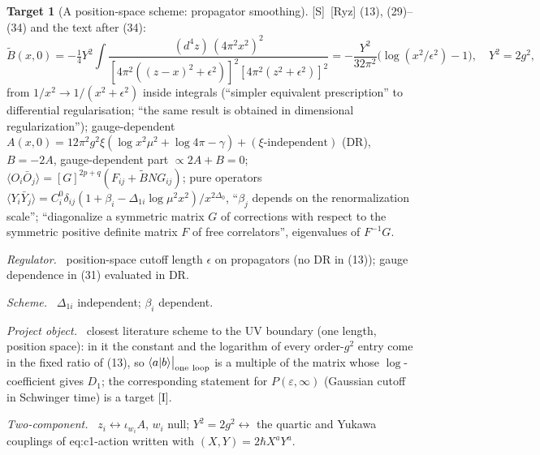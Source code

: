 \documentclass[11pt]{article}
\theoremstyle{definition}
\newtheorem{target}{Target}
\newcommand{\Sl}{\textup{[S]}}
\newcommand{\Il}{\textup{[I]}}
\newcommand{\oneloop}{\big|_{\rm one\ loop}}
\newcommand{\fld}[1]{\par\textit{#1.}\ }
\begin{document}
\begin{target}[A position-space scheme: propagator smoothing]\label{t:ryz}
\Sl\ [Ryz] (13), (29)--(34) and the text after (34):
\[
\tilde B(x,0)=-\tfrac14Y^2\!\int\!\frac{(d^4z)\,(4\pi^2x^2)^2}{[4\pi^2((z-x)^2+\epsilon^2)]^2[4\pi^2(z^2+\epsilon^2)]^2}=-\frac{Y^2}{32\pi^2}\big(\log(x^2/\epsilon^2)-1\big),\quad Y^2=2g^2,
\]
from $1/x^2\to1/(x^2+\epsilon^2)$ inside integrals (``simpler equivalent prescription'' to differential regularisation; ``the same result is obtained in dimensional regularization''); gauge-dependent $A(x,0)=12\pi^2g^2\xi(\log x^2\mu^2+\log4\pi-\gamma)+(\xi\text{-independent})$ (DR), $B=-2A$, gauge-dependent part $\propto2A+B=0$; $\langle O_i\bar O_j\rangle=[G]^{2p+q}(F_{ij}+\tilde BNG_{ij})$; pure operators $\langle Y_i\bar Y_j\rangle=C_i^0\delta_{ij}(1+\beta_i-\Delta_{1i}\log\mu^2x^2)/x^{2\Delta_0}$, ``$\beta_j$ depends on the renormalization scale''; ``diagonalize a symmetric matrix $G$ of corrections with respect to the symmetric positive definite matrix $F$ of free correlators'', eigenvalues of $F^{-1}G$.
\fld{Regulator} position-space cutoff length $\epsilon$ on propagators (no DR in (13)); gauge dependence in (31) evaluated in DR.
\fld{Scheme} $\Delta_{1i}$ independent; $\beta_i$ dependent.
\fld{Project object} closest literature scheme to the UV boundary (one length, position space): in it the constant and the logarithm of every order-$g^2$ entry come in the fixed ratio of (13), so $\langle a|b\rangle\oneloop$ is a multiple of the matrix whose $\log$-coefficient gives $D_1$; the corresponding statement for $P(\varepsilon,\infty)$ (Gaussian cutoff in Schwinger time) is a target \Il.
\fld{Two-component} $z_i\leftrightarrow\iota_{w_i}A$, $w_i$ null; $Y^2=2g^2\leftrightarrow$ the quartic and Yukawa couplings of eq:c1-action written with $(X,Y)=2\hbar X^aY^a$.
\end{target}
\end{document}
